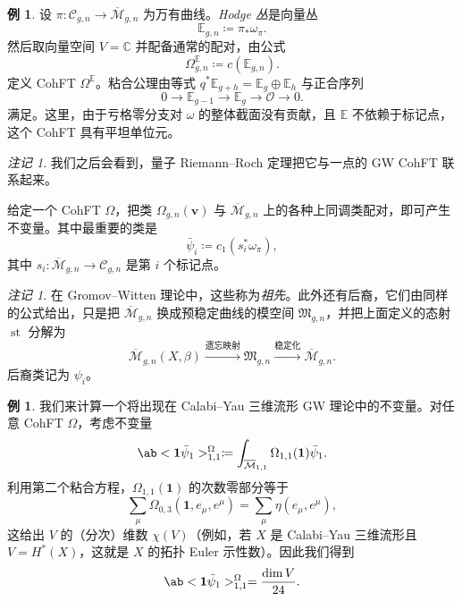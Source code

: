 \documentclass{amsart}
\theoremstyle{definition}
\newtheorem{exm}[thm]{例}
\theoremstyle{remark}
\newtheorem{rmk}[thm]{注记}
\theoremstyle{plain}
\theoremstyle{definition}
\theoremstyle{remark}
\newcommand{\C}{\mathbb{C}}
\newcommand{\E}{\mathbb{E}}
\newcommand{\Mbar}{\overline{\mathcal{M}}}
\newcommand{\mc}[1]{\mathcal{#1}}
\newcommand{\mf}[1]{\mathfrak{#1}}
\newcommand{\mbf}[1]{\mathbf{#1}}
\newcommand{\bv}{\mbf{v}}
\newcommand{\1}{\mathbf{1}}
\newcommand{\2}{\mathbf{2}}
\newcommand{\3}{\mathbf{3}}
\DeclareMathOperator{\st}{st}
\begin{document}
\begin{exm}
    设 $\pi \colon \mc{C}_{g,n} \to \Mbar_{g,n}$ 为万有曲线。\textit{Hodge 丛}是向量丛
    \[ \E_{g,n} \coloneqq \pi_* \omega_{\pi}. \]
    然后取向量空间 $V = \C$ 并配备通常的配对，由公式
    \[ \Omega^{\E}_{g,n} \coloneqq c(\E_{g,n}). \]
    定义 CohFT $\Omega^{\E}$。粘合公理由等式 $q^* \E_{g+h} = \E_g \oplus \E_h$ 与正合序列
    \[ 0 \to \E_{g-1} \to \E_g \to \mc{O} \to 0. \]
    满足。这里，由于亏格零分支对 $\omega$ 的整体截面没有贡献，且 $\E$ 不依赖于标记点，这个 CohFT 具有平坦单位元。
\end{exm}

\begin{rmk}
    我们之后会看到，量子 Riemann--Roch 定理把它与一点的 GW CohFT 联系起来。
\end{rmk}

给定一个 CohFT $\Omega$，把类 $\Omega_{g,n}(\bv)$ 与 $\Mbar_{g,n}$ 上的各种上同调类配对，即可产生不变量。其中最重要的类是
\[ \bar{\psi}_i \coloneqq c_1( s_i^* \omega_{\pi} ), \]
其中 $s_i \colon \Mbar_{g,n} \to \mc{C}_{g,n}$ 是第 $i$ 个标记点。

\begin{rmk}
    在 Gromov--Witten 理论中，这些称为\textit{祖先}。此外还有后裔，它们由同样的公式给出，只是把 $\Mbar_{g,n}$ 换成预稳定曲线的模空间 $\mf{M}_{g,n}$，并把上面定义的态射 $\st$ 分解为
    \[ \Mbar_{g,n}(X,\beta) \xrightarrow{\text{遗忘映射}} \mf{M}_{g,n} \xrightarrow{\text{稳定化}} \Mbar_{g,n}. \]
    后裔类记为 $\psi_i$。
\end{rmk}

\begin{exm}
    我们来计算一个将出现在 Calabi--Yau 三维流形 GW 理论中的不变量。对任意 CohFT $\Omega$，考虑不变量
    \[ \ab<\1\bar{\psi}_1>_{1,1}^{\Omega}\coloneqq \int_{\Mbar_{1,1}} \Omega_{1,1}(\1)\bar{\psi}_1. \]
    利用第二个粘合方程，$\Omega_{1,1}(\1)$ 的次数零部分等于
    \[ \sum_{\mu} \Omega_{0,3}(\1, e_{\mu}, e^{\mu}) = \sum_{\mu} \eta(e_{\mu}, e^{\mu}), \]
    这给出 $V$ 的（分次）维数 $\chi(V)$（例如，若 \(X\) 是 Calabi--Yau 三维流形且 \(V = H^*(X)\)，这就是 \(X\) 的拓扑 Euler 示性数）。因此我们得到
    \[ \ab<\1\bar{\psi}_1>_{1,1}^{\Omega} = \frac{\dim V}{24}. \]
\end{exm}
\end{document}
